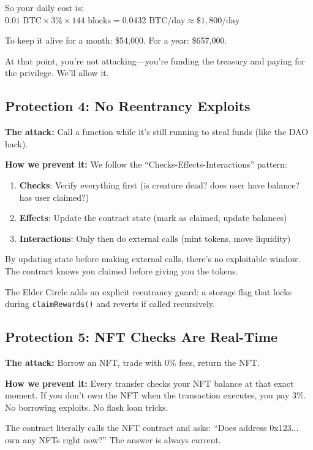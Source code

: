 \documentclass[11pt,a4paper]{article}
\begin{document}
So your daily cost is: $0.01 \text{ BTC} \times 3\% \times 144 \text{ blocks} = 0.0432 \text{ BTC/day} \approx \$1,800/\text{day}$

To keep it alive for a month: \$54,000. For a year: \$657,000.

At that point, you're not attacking---you're funding the treasury and paying for the privilege. We'll allow it.

\subsection{Protection 4: No Reentrancy Exploits}

\textbf{The attack:} Call a function while it's still running to steal funds (like the DAO hack).

\textbf{How we prevent it:} We follow the ``Checks-Effects-Interactions'' pattern:
\begin{enumerate}
    \item \textbf{Checks}: Verify everything first (is creature dead? does user have balance? has user claimed?)
    \item \textbf{Effects}: Update the contract state (mark as claimed, update balances)
    \item \textbf{Interactions}: Only then do external calls (mint tokens, move liquidity)
\end{enumerate}

By updating state before making external calls, there's no exploitable window. The contract knows you claimed before giving you the tokens.

The Elder Circle adds an explicit reentrancy guard: a storage flag that locks during \texttt{claimRewards()} and reverts if called recursively.

\subsection{Protection 5: NFT Checks Are Real-Time}

\textbf{The attack:} Borrow an NFT, trade with 0\% fees, return the NFT.

\textbf{How we prevent it:} Every transfer checks your NFT balance at that exact moment. If you don't own the NFT when the transaction executes, you pay 3\%. No borrowing exploits. No flash loan tricks.

The contract literally calls the NFT contract and asks: ``Does address 0x123... own any NFTs right now?'' The answer is always current.
\end{document}
